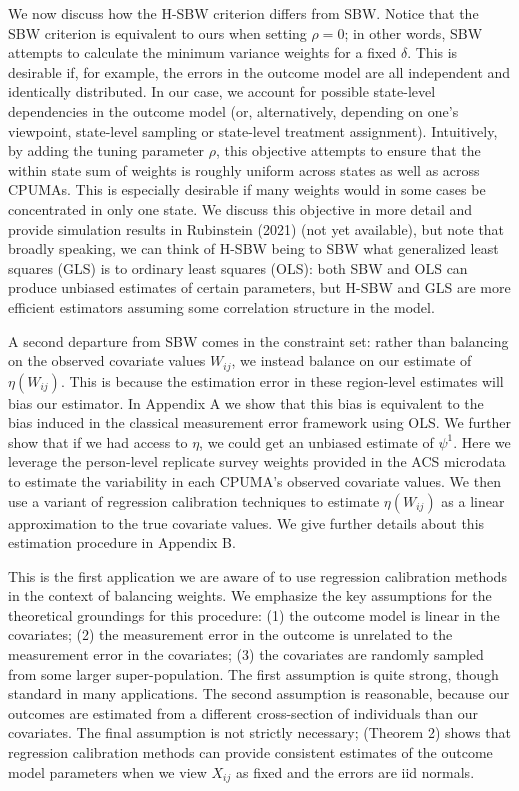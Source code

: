\documentclass[12pt]{article}
\begin{document}
We now discuss how the H-SBW criterion differs from SBW. Notice that the SBW criterion is equivalent to ours when setting $\rho = 0$; in other words, SBW attempts to calculate the minimum variance weights for a fixed $\delta$. This is desirable if, for example, the errors in the outcome model are all independent and identically distributed. In our case, we account for possible state-level dependencies in the outcome model (or, alternatively, depending on one's viewpoint, state-level sampling or state-level treatment assignment). Intuitively, by adding the tuning parameter $\rho$, this objective attempts to ensure that the within state sum of weights is roughly uniform across states as well as across CPUMAs. This is especially desirable if many weights would in some cases be concentrated in only one state. We discuss this objective in more detail and provide simulation results in Rubinstein (2021) (not yet available), but note that broadly speaking, we can think of H-SBW being to SBW what generalized least squares (GLS) is to ordinary least squares (OLS): both SBW and OLS can produce unbiased estimates of certain parameters, but H-SBW and GLS are more efficient estimators assuming some correlation structure in the model.

A second departure from SBW comes in the constraint set: rather than balancing on the observed covariate values $W_{ij}$, we instead balance on our estimate of $\eta(W_{ij})$. This is because the estimation error in these region-level estimates will bias our estimator. In Appendix A we show that this bias is equivalent to the bias induced in the classical measurement error framework using OLS. We further show that if we had access to $\eta$, we could get an unbiased estimate of $\psi^1$. Here we leverage the person-level replicate survey weights provided in the ACS microdata to estimate the variability in each CPUMA's observed covariate values. We then use a variant of regression calibration techniques to estimate $\eta(W_{ij})$ as a linear approximation to the true covariate values. We give further details about this estimation procedure in Appendix B.

This is the first application we are aware of to use regression calibration methods in the context of balancing weights. We emphasize the key assumptions for the theoretical groundings for this procedure: (1) the outcome model is linear in the covariates; (2) the measurement error in the outcome is unrelated to the measurement error in the covariates; (3) the covariates are randomly sampled from some larger super-population. The first assumption is quite strong, though standard in many applications. The second assumption is reasonable, because our outcomes are estimated from a different cross-section of individuals than our covariates. The final assumption is not strictly necessary; \cite{gleser1992importance} (Theorem 2) shows that regression calibration methods can provide consistent estimates of the outcome model parameters when we view $X_{ij}$ as fixed and the errors are iid normals.
\end{document}
